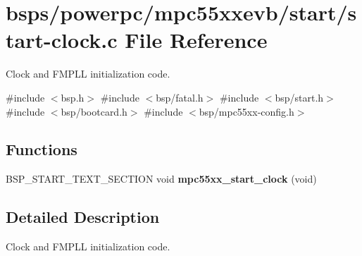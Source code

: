 \hypertarget{start-clock_8c}{}\section{bsps/powerpc/mpc55xxevb/start/start-\/clock.c File Reference}
\label{start-clock_8c}


Clock and F\+M\+P\+LL initialization code.  


{\ttfamily \#include $<$bsp.\+h$>$}\newline
{\ttfamily \#include $<$bsp/fatal.\+h$>$}\newline
{\ttfamily \#include $<$bsp/start.\+h$>$}\newline
{\ttfamily \#include $<$bsp/bootcard.\+h$>$}\newline
{\ttfamily \#include $<$bsp/mpc55xx-\/config.\+h$>$}\newline
\subsection*{Functions}
\begin{DoxyCompactItemize}
\item 
\mbox{\label{start-clock_8c_abdf1d1ce4a9173dedaf47b4fa1b6e34c}} 
B\+S\+P\+\_\+\+S\+T\+A\+R\+T\+\_\+\+T\+E\+X\+T\+\_\+\+S\+E\+C\+T\+I\+ON void {\bfseries mpc55xx\+\_\+start\+\_\+clock} (void)
\end{DoxyCompactItemize}


\subsection{Detailed Description}
Clock and F\+M\+P\+LL initialization code. 

